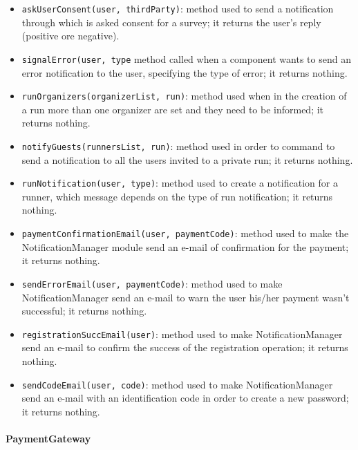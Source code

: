 \begin{itemize}
\item[ ]\texttt{askUserConsent(user, thirdParty)}: method used to send a notification through which is asked consent for a survey; it returns the user's reply (positive ore negative).

\item[ ]\texttt{signalError(user, type} method called when a component wants to send an error notification to the user, specifying the type of error; it returns nothing.

\item[ ]\texttt{runOrganizers(organizerList, run)}: method used when in the creation of a run more than one organizer are set and they need to be informed; it returns nothing.

\item[ ]\texttt{notifyGuests(runnersList, run)}: method used in order to command to send a notification to all the users invited to a private run; it returns nothing.

\item[ ]\texttt{runNotification(user, type)}: method used to create a notification for a runner, which message depends on the type of run notification; it returns nothing.

\item[ ]\texttt{paymentConfirmationEmail(user, paymentCode)}: method used to make the NotificationManager module send an e-mail of confirmation for the payment; it returns nothing.

\item[ ]\texttt{sendErrorEmail(user, paymentCode)}: method used to make NotificationManager send an e-mail to warn the user his/her payment wasn't successful; it returns nothing.

\item[ ]\texttt{registrationSuccEmail(user)}: method used to make NotificationManager send an e-mail to confirm the success of the registration operation; it returns nothing.

\item[ ]\texttt{sendCodeEmail(user, code)}: method used to make NotificationManager send an e-mail with an identification code in order to create a new password; it returns nothing.
\end{itemize}

\paragraph{PaymentGateway}

